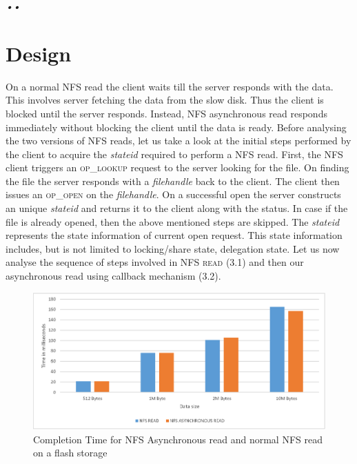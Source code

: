 \textit{\emph{•\emph{\textit{•}}}}\section{Design}

\label{Design}

On a normal NFS read the client waits till the server responds with the data. This involves server fetching the data from the slow disk. Thus the client is blocked until the server responds. Instead, NFS asynchronous read responds immediately without blocking the client until the data is ready. Before analysing the two versions of NFS reads, let us take a look at the initial steps performed by the client to acquire the \textit{stateid} required to perform a NFS read. First, the NFS client triggers an \textsc{op\_lookup} request to the server looking for the file. On finding the file the server responds with a \textit{filehandle} back to the client. The client then issues an \textsc{op\_open} on the \textit{filehandle}. On a successful open the server constructs an unique \textit{stateid} and returns it to the client along with the status. In case if the file is already opened,    then the above mentioned steps are skipped. The \textit{stateid} represents the state information of current open request. This state information includes, but is not limited to locking/share state, delegation state. Let us now analyse the sequence of steps involved in \textsc{NFS read} (3.1) and then our asynchronous read using callback mechanism (3.2).

\begin{figure}
\centering
\includegraphics[scale=1.0]{figures/completion_time.eps}
\caption{Completion	Time for NFS Asynchronous read and normal NFS read on a flash storage}
\label{fig:NFSCompletionTimes}
\end{figure}  

